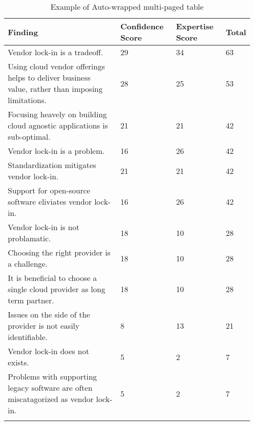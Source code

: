 
\renewcommand\arraystretch{1.5}%
\begin{longtable}{|p{10cm}|p{2cm}|p{2cm}|}
\hline
\textbf{Finding}  & \textbf{Confidence Score} & \textbf{Expertise Score} & \textbf{Total} \\ \hline
\endhead
Vendor lock-in is a tradeoff. & 29 & 34 & 63 \\ \hline
Using cloud vendor offerings helps to deliver business value, rather than imposing limitations. & 28 & 25 & 53 \\ \hline
Focusing heavely on building cloud agnostic applications is sub-optimal. & 21 & 21 & 42 \\ \hline
Vendor lock-in is a problem. & 16 & 26 & 42 \\ \hline
Standardization mitigates vendor lock-in. & 21 & 21 & 42 \\ \hline
Support for open-source software eliviates vendor lock-in. & 16 & 26 & 42 \\ \hline
Vendor lock-in is not problamatic. & 18 & 10 & 28 \\ \hline
Choosing the right provider is a challenge. & 18 & 10 & 28 \\ \hline
It is beneficial to choose a single cloud provider as long term partner. & 18 & 10 & 28 \\ \hline
Issues on the side of the provider is not easily identifiable. & 8 & 13 & 21 \\ \hline
Vendor lock-in does not exists. & 5 & 2 & 7 \\ \hline
Problems with supporting legacy software are often miscatagorized as vendor lock-in. & 5 & 2 & 7 \\ \hline
\caption{Example of Auto-wrapped multi-paged table}
\label{tab:table1}
\end{longtable}
